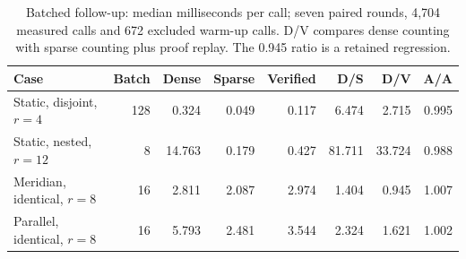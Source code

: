 \begin{table}[htbp]
\centering\footnotesize
\setlength{\tabcolsep}{4pt}
\begin{tabular}{@{}lrrrrrrr@{}}
\toprule
Case & Batch & Dense & Sparse & Verified & D/S & D/V & A/A\\
\midrule
Static, disjoint, $r=4$ & 128 & 0.324 & 0.049 & 0.117 & 6.474 & 2.715 & 0.995\\
Static, nested, $r=12$ & 8 & 14.763 & 0.179 & 0.427 & 81.711 & 33.724 & 0.988\\
Meridian, identical, $r=8$ & 16 & 2.811 & 2.087 & 2.974 & 1.404 & 0.945 & 1.007\\
Parallel, identical, $r=8$ & 16 & 5.793 & 2.481 & 3.544 & 2.324 & 1.621 & 1.002\\
\bottomrule
\end{tabular}
\caption{Batched follow-up: median milliseconds per call; seven paired rounds, 4,704 measured calls and 672 excluded warm-up calls. D/V compares dense counting with sparse counting plus proof replay. The 0.945 ratio is a retained regression.}
\label{tab:batched}
\end{table}
